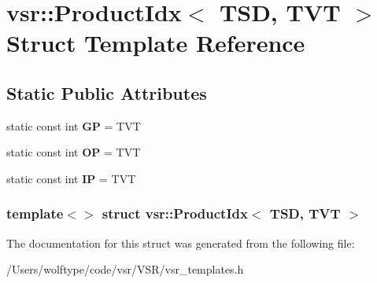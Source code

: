 \hypertarget{structvsr_1_1_product_idx_3_01_t_s_d_00_01_t_v_t_01_4}{\section{vsr\-:\-:Product\-Idx$<$ T\-S\-D, T\-V\-T $>$ Struct Template Reference}
\label{structvsr_1_1_product_idx_3_01_t_s_d_00_01_t_v_t_01_4}
}
\subsection*{Static Public Attributes}
\begin{DoxyCompactItemize}
\item 
\hypertarget{structvsr_1_1_product_idx_3_01_t_s_d_00_01_t_v_t_01_4_a361cf561185cfbc75bfd97c2994a442e}{static const int {\bfseries G\-P} = T\-V\-T}\label{structvsr_1_1_product_idx_3_01_t_s_d_00_01_t_v_t_01_4_a361cf561185cfbc75bfd97c2994a442e}

\item 
\hypertarget{structvsr_1_1_product_idx_3_01_t_s_d_00_01_t_v_t_01_4_a08f8837cfc997aab7f4ee2275e9cb2a4}{static const int {\bfseries O\-P} = T\-V\-T}\label{structvsr_1_1_product_idx_3_01_t_s_d_00_01_t_v_t_01_4_a08f8837cfc997aab7f4ee2275e9cb2a4}

\item 
\hypertarget{structvsr_1_1_product_idx_3_01_t_s_d_00_01_t_v_t_01_4_a635e1136d58400201f3925d777f477f3}{static const int {\bfseries I\-P} = T\-V\-T}\label{structvsr_1_1_product_idx_3_01_t_s_d_00_01_t_v_t_01_4_a635e1136d58400201f3925d777f477f3}

\end{DoxyCompactItemize}
\subsubsection*{template$<$$>$ struct vsr\-::\-Product\-Idx$<$ T\-S\-D, T\-V\-T $>$}



The documentation for this struct was generated from the following file\-:\begin{DoxyCompactItemize}
\item 
/\-Users/wolftype/code/vsr/\-V\-S\-R/vsr\-\_\-templates.\-h\end{DoxyCompactItemize}
